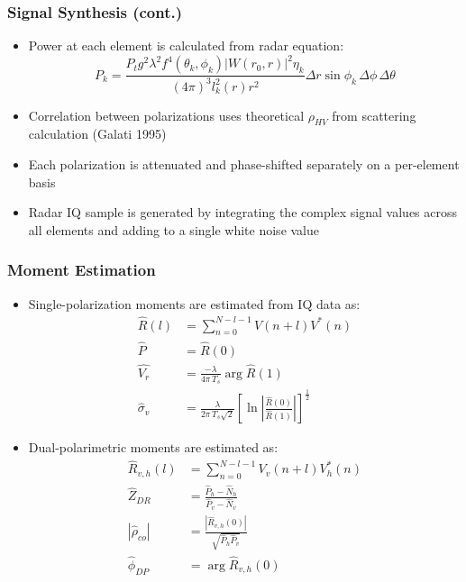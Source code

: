 \documentclass[red]{beamer}
\begin{document}
\begin{frame}[<+->]
	\frametitle{Signal Synthesis (cont.)}
		\begin{itemize}
		\item Power at each element is calculated from radar equation:
		\begin{equation}
		    P_k = \frac{P_t g^2 \lambda^2 f^4(\theta_k,\phi_k) |W(r_0, r)|^2 \eta_k}
		        {(4 \pi)^3 l_k^2(r) r^2} \Delta r \sin\phi_k \,\Delta\phi \,\Delta\theta
		\end{equation}
		\item Correlation between polarizations uses theoretical $\rho_{HV}$ from scattering calculation (Galati 1995)
		\item Each polarization is attenuated and phase-shifted separately on a per-element basis
		\item Radar IQ sample is generated by integrating the complex signal
		values across all elements and adding to a single white noise value
	\end{itemize}
\end{frame}

\begin{frame}
	\frametitle{Moment Estimation}
	\begin{itemize}
		\item Single-polarization moments are estimated from IQ data as:
	\begin{align}
	    \hat{R}(l) &= \sum_{n=0}^{N-l-1} V(n + l) V^*(n) \\
	    \hat{P} &= \hat{R}(0) \\
	    \hat{V_r} &= \frac{-\lambda}{4 \pi \,T_s} \arg{\hat{R}(1)} \\
	    \hat{\sigma}_v &= \frac{\lambda}{2 \pi \,T_s \sqrt{2}}
	        \left[\ln{\left|\frac{\hat{R}(0)}{\hat{R}(1)}\right|}\right]^{\frac{1}{2}}
	\end{align}
	\item Dual-polarimetric moments are estimated as:
	\begin{align}
	    \hat{R}_{v,h}(l) &= \sum_{n=0}^{N-l-1} V_{v}(n+l) V_{h}^*(n) \\
	    \hat{Z}_{DR} & = \frac{\hat{P}_h - \hat{N}_h}{\hat{P}_v - \hat{N}_v} \\
	    |\hat{\rho}_{co}| &= \frac{|\hat{R}_{v,h}(0)|}{\sqrt{\hat{P}_h\hat{P}_v}} \\
	    \hat{\phi}_{DP} &= \arg{\hat{R}_{v,h}(0)}
	\end{align}
	\end{itemize}
\end{frame}
\end{document}
